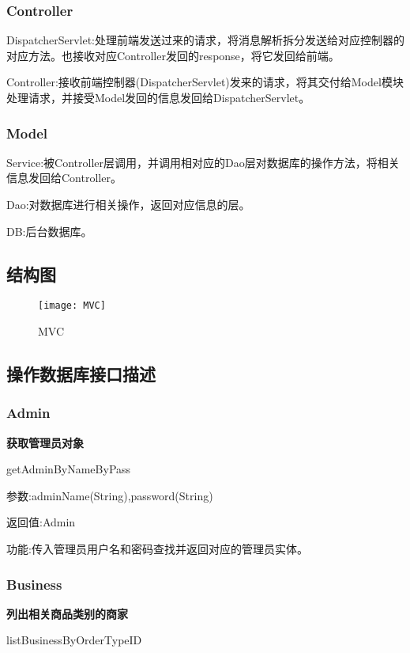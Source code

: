 \subsubsection{Controller}
DispatcherServlet:处理前端发送过来的请求，将消息解析拆分发送给对应控制器的对应方法。也接收对应Controller发回的response，将它发回给前端。

Controller:接收前端控制器(DispatcherServlet)发来的请求，将其交付给Model模块处理请求，并接受Model发回的信息发回给DispatcherServlet。

\subsubsection{Model}
Service:被Controller层调用，并调用相对应的Dao层对数据库的操作方法，将相关信息发回给Controller。

Dao:对数据库进行相关操作，返回对应信息的层。

DB:后台数据库。

\subsection{结构图}

\begin{figure}[htbp]
    \centering
    \texttt{[image: MVC]}
    \caption{MVC}\label{fig:MVC}
    \vspace{\baselineskip}
\end{figure}

\subsection{操作数据库接口描述}

\subsubsection{Admin}
\textbf{获取管理员对象}

getAdminByNameByPass

参数:adminName(String),password(String)

返回值:Admin

功能:传入管理员用户名和密码查找并返回对应的管理员实体。

\subsubsection{Business}
\textbf{列出相关商品类别的商家}

listBusinessByOrderTypeID

